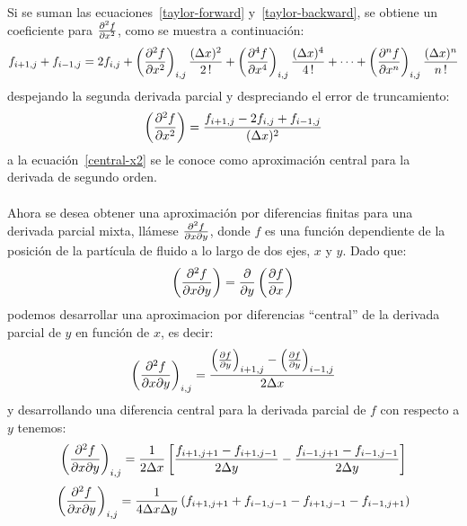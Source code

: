 \documentclass[letterpaper, openright, 12pt]{book}
\begin{document}
    \paragraph*{}
    Si se suman las ecuaciones~\ref{taylor-forward} y~\ref{taylor-backward}, se
    obtiene un coeficiente para $\pdv[2]{f}{x}$, como se muestra a continuación:
    \begin{equation*}
    f_{i+1,j} + f_{i-1, j} = 2 f_{i,j} + \left( \pdv[2]{f}{x} \right)_{i,j} \frac{(\Delta x) ^2}{2\,!} + \left( \pdv[4]{f}{x} \right)_{i,j} \frac{(\Delta x)^4}{4\,!} + \dotsb + \left( \pdv[n]{f}{x} \right)_{i,j} \frac{(\Delta x)^n}{n\,!}
    \end{equation*}
    despejando la segunda derivada parcial y despreciando el error de truncamiento:
    \begin{equation}
    \left( \pdv[2]{f}{x} \right) = \frac{f_{i+1,j} - 2f_{i,j} + f_{i-1,j}}{(\Delta x)^2}
    \label{central-x2}
    \end{equation}
    a la ecuación~\ref{central-x2} se le conoce como aproximación central para
    la derivada de segundo orden.

    \paragraph*{}
    Ahora se desea obtener una aproximación por diferencias finitas para una
    derivada parcial mixta, llámese $\pdv{f}{x}{y}$, donde $f$ es una función
    dependiente de la posición de la partícula de fluido a lo largo de dos ejes,
    $x$ y $y$. Dado que:
    \begin{equation}
    \left( \pdv{f}{x}{y} \right) = \pdv{y} \left( \pdv{f}{x} \right)
    \end{equation}
    podemos desarrollar una aproximacion por diferencias ``central'' de la
    derivada parcial de $y$ en función de $x$, es decir:
    \begin{equation}
    \left( \pdv{f}{x}{y} \right)_{i,j} = \frac{\left( \pdv{f}{y} \right)_{i+1, j} - \left( \pdv{f}{y} \right)_{i-1,j}}{2 \Delta x}
    \end{equation}
    y desarrollando una diferencia central para la derivada parcial de $f$ con
    respecto a $y$ tenemos:
    \begin{equation}
    \left( \pdv{f}{x}{y} \right)_{i,j} = \frac{1}{2 \Delta x} \left[ \frac{f_{i+1, j+1} - f_{i+1, j-1}}{2 \Delta y} - \frac{f_{i-1, j+1} - f_{i-1, j-1}}{2 \Delta y} \right]
    \end{equation}
    \begin{equation}
    \left( \pdv{f}{x}{y} \right)_{i,j} = \frac{1}{4 \Delta x \Delta y} \left( f_{i+1, j+1} + f_{i-1, j-1} - f_{i+1, j-1} - f_{i-1, j+1} \right)
    \end{equation}
\end{document}
